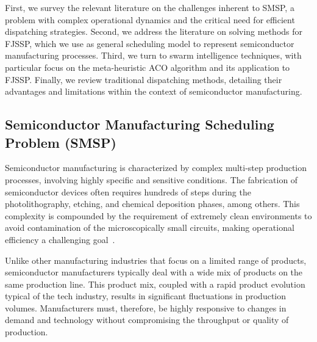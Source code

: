 First, we survey the relevant literature on the challenges inherent to SMSP, a problem with complex operational dynamics and the critical need for efficient dispatching strategies. 
Second, we address the literature on solving methods for FJSSP, which we use as general
scheduling model to represent semiconductor manufacturing processes. %
Third, we turn to swarm intelligence techniques, with particular focus on the meta-heuristic ACO algorithm and its application to FJSSP.
Finally, we review traditional dispatching methods, detailing their advantages and limitations within the context of semiconductor manufacturing.
\subsection{Semiconductor Manufacturing Scheduling Problem (SMSP)}
Semiconductor manufacturing is characterized by complex multi-step production processes, involving highly specific and sensitive conditions. The fabrication of semiconductor devices often requires hundreds of steps during the photolithography, etching, and chemical deposition phases, among others. This complexity is compounded by the requirement of extremely clean environments to avoid contamination of the microscopically small circuits, making operational efficiency a challenging goal~\cite{May2006}.

Unlike other manufacturing industries that focus on a limited range of products, semiconductor manufacturers typically deal with a wide mix of products on the same production line. This product mix, coupled with a rapid product evolution typical of the tech industry, results in significant fluctuations in production volumes. Manufacturers must, therefore, be highly responsive to changes in demand and technology without compromising the throughput or quality of production.

